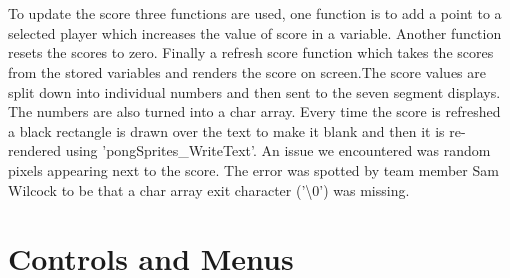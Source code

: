 \documentclass[a4paper,12pt]{article}
\begin{document}
\begin{flushleft}
\\ \- \\
To update the score three functions are used, one function is to add a point to a selected player which increases the value of score in a variable. Another function resets the scores to zero. Finally a refresh score function which takes the scores from the stored variables and renders the score on screen.The score values are split down into individual numbers and then sent to the seven segment displays. The numbers are also turned into a char array. Every time the score is refreshed a black rectangle is drawn over the text to make it blank and then it is re-rendered using 'pongSprites\_WriteText'. An issue we encountered was random pixels appearing next to the score. The error was spotted by team member Sam Wilcock to be that a char array exit character ('\textbackslash{}0') was missing.
\end{flushleft}



\newpage
\section{Controls and Menus}
\end{document}
